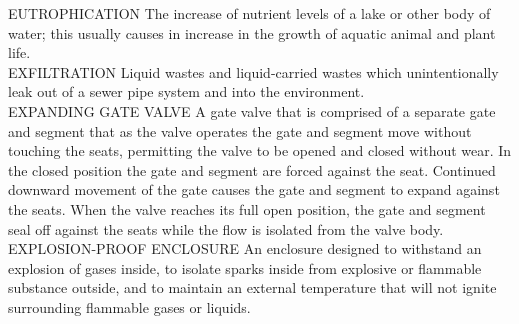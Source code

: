 \documentclass{article}
\begin{document}
EUTROPHICATION
The increase of nutrient levels of a lake or other body of water; this usually causes in increase in the growth of aquatic animal and plant life.
\vspace{0.3cm}\\
EXFILTRATION
Liquid wastes and liquid-carried wastes which unintentionally leak out of a sewer pipe system and into the environment. 
\vspace{0.3cm}\\
EXPANDING GATE VALVE
A gate valve that is comprised of a separate gate and segment that as the valve operates the gate and segment move without touching the seats, permitting the valve to be opened and closed without wear. In the closed position the gate and segment are forced against the seat. Continued downward movement of the gate causes the gate and segment to expand against the seats. When the valve reaches its full open position, the gate and segment seal off against the seats while the flow is isolated from the valve body.
\vspace{0.3cm}\\
EXPLOSION-PROOF ENCLOSURE
An enclosure designed to withstand an explosion of gases inside, to isolate sparks inside from explosive or flammable substance outside, and to maintain an external temperature that will not ignite surrounding flammable gases or liquids.
\vspace{0.3cm}\\
\end{document}

